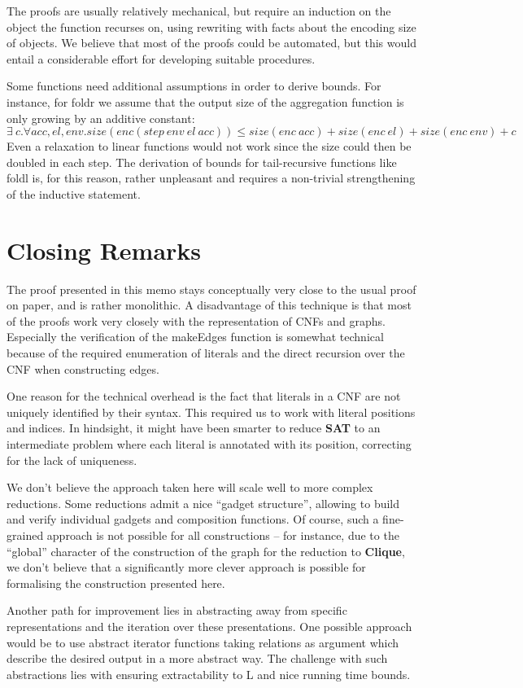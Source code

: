 \documentclass[a4paper,UKenglish,cleveref, autoref]{lipics-v2019}
\begin{document}
The proofs are usually relatively mechanical, but require an induction on the object the function recurses on, using rewriting with facts about the encoding size of objects. We believe that most of the proofs could be automated, but this would entail a considerable effort for developing suitable procedures.

Some functions need additional assumptions in order to derive bounds. For instance, for \textsf{foldr} we assume that the output size of the aggregation function is only growing by an additive constant:
\[ \exists~c. \forall acc, el, env. size(enc (step~env~el~acc)) \le size(enc~acc) + size(enc~el) + size(enc~env) + c \]
Even a relaxation to linear functions would not work since the size could then be doubled in each step.
The derivation of bounds for tail-recursive functions like \textsf{foldl} is, for this reason, rather unpleasant and requires a non-trivial strengthening of the inductive statement.

\section{Closing Remarks}
The proof presented in this memo stays conceptually very close to the usual proof on paper, and is rather monolithic. A disadvantage of this technique is that most of the proofs work very closely with the representation of CNFs and graphs. Especially the verification of the \textsf{makeEdges} function is somewhat technical because of the required enumeration of literals and the direct recursion over the CNF when constructing edges.

One reason for the technical overhead is the fact that literals in a CNF are not uniquely identified by their syntax. This required us to work with literal positions and indices. In hindsight, it might have been smarter to reduce \textbf{SAT} to an intermediate problem where each literal is annotated with its position, correcting for the lack of uniqueness.

We don't believe the approach taken here will scale well to more complex reductions. Some reductions admit a nice ``gadget structure'', allowing to build and verify individual gadgets and composition functions. Of course, such a fine-grained approach is not possible for all constructions -- for instance, due to the ``global'' character of the construction of the graph for the reduction to \textbf{Clique}, we don't believe that a significantly more clever approach is possible for formalising the construction presented here.

Another path for improvement lies in abstracting away from specific representations and the iteration over these presentations. One possible approach would be to use abstract iterator functions taking relations as argument which describe the desired output in a more abstract way. The challenge with such abstractions lies with ensuring extractability to L and nice running time bounds. 

{}
\end{document}
